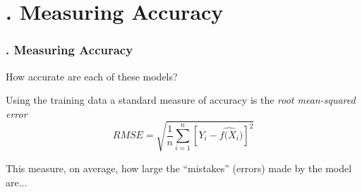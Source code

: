 \documentclass[flegn]{beamer}
\newcommand{\skoo}{\vspace{.2in}}
\begin{document}
\section{. Measuring Accuracy}
\begin{frame}
\frametitle{. Measuring Accuracy}
{\color{red}How accurate are each of these models?}

\skoo 
Using the training data a standard measure of accuracy is the {\color{blue} \it root mean-squared error}
$$
RMSE = \sqrt{\frac{1}{n} \sum_{i=1}^n \left[Y_i - \widehat{f(X_i})\right]^2}
$$

\skoo 
This measure, on average, how large the ``mistakes'' (errors) made by the model are... 

\end{frame}
\end{document}
